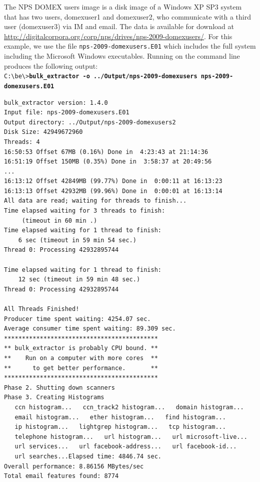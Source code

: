 The NPS DOMEX users image is a disk image of a Windows XP SP3 system that has two users, domexuser1 and domexuser2, who communicate with a third user (domexuser3) via IM and email.  The data is available for download at \url{http://digitalcorpora.org/corp/nps/drives/nps-2009-domexusers/}. For this example, we use the file \texttt{nps-2009-domexusers.E01} which includes the full system including the Microsoft Windows executables. Running \bulk on the command line produces the following output:\\

\begingroup
\footnotesize
\texttt{C:\textbackslash be\textbackslash \textgreater \textbf{bulk\_extractor -o ../Output/nps-2009-domexusers nps-2009-domexusers.E01}}
\endgroup
\begingroup
\footnotesize
\begin{Verbatim}[fontfamily=courier, commandchars=\\\{\}]
bulk_extractor version: 1.4.0
Input file: nps-2009-domexusers.E01
Output directory: ../Output/nps-2009-domexusers2
Disk Size: 42949672960
Threads: 4
16:50:53 Offset 67MB (0.16%) Done in  4:23:43 at 21:14:36
16:51:19 Offset 150MB (0.35%) Done in  3:58:37 at 20:49:56
...
16:13:12 Offset 42849MB (99.77%) Done in  0:00:11 at 16:13:23
16:13:13 Offset 42932MB (99.96%) Done in  0:00:01 at 16:13:14
All data are read; waiting for threads to finish...
Time elapsed waiting for 3 threads to finish:
     (timeout in 60 min .)
Time elapsed waiting for 1 thread to finish:
    6 sec (timeout in 59 min 54 sec.)
Thread 0: Processing 42932895744

Time elapsed waiting for 1 thread to finish:
    12 sec (timeout in 59 min 48 sec.)
Thread 0: Processing 42932895744

All Threads Finished!
Producer time spent waiting: 4254.07 sec.
Average consumer time spent waiting: 89.309 sec.
*******************************************
** bulk_extractor is probably CPU bound. **
**    Run on a computer with more cores  **
**      to get better performance.       **
*******************************************
Phase 2. Shutting down scanners
Phase 3. Creating Histograms
   ccn histogram...   ccn_track2 histogram...   domain histogram...
   email histogram...   ether histogram...   find histogram...
   ip histogram...   lightgrep histogram...   tcp histogram...
   telephone histogram...   url histogram...   url microsoft-live...
   url services...   url facebook-address...   url facebook-id...
   url searches...Elapsed time: 4846.74 sec.
Overall performance: 8.86156 MBytes/sec
Total email features found: 8774
\end{Verbatim}
\endgroup

